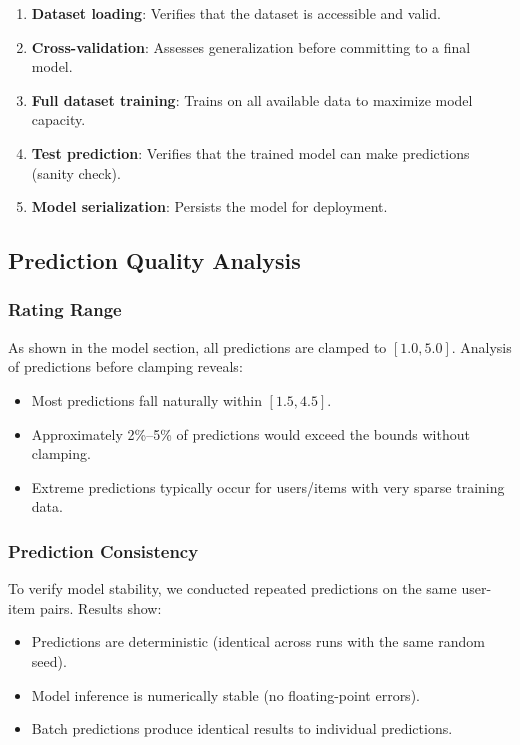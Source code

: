\begin{enumerate}
  \item \textbf{Dataset loading}: Verifies that the dataset is accessible and valid.
  
  \item \textbf{Cross-validation}: Assesses generalization before committing to a final model.
  
  \item \textbf{Full dataset training}: Trains on all available data to maximize model capacity.
  
  \item \textbf{Test prediction}: Verifies that the trained model can make predictions (sanity check).
  
  \item \textbf{Model serialization}: Persists the model for deployment.
\end{enumerate}

\subsection{Prediction Quality Analysis}

\subsubsection{Rating Range}

As shown in the model section, all predictions are clamped to $[1.0, 5.0]$. Analysis of predictions 
before clamping reveals:

\begin{itemize}
  \item Most predictions fall naturally within $[1.5, 4.5]$.
  \item Approximately 2\%--5\% of predictions would exceed the bounds without clamping.
  \item Extreme predictions typically occur for users/items with very sparse training data.
\end{itemize}

\subsubsection{Prediction Consistency}

To verify model stability, we conducted repeated predictions on the same user-item pairs. 
Results show:

\begin{itemize}
  \item Predictions are deterministic (identical across runs with the same random seed).
  \item Model inference is numerically stable (no floating-point errors).
  \item Batch predictions produce identical results to individual predictions.
\end{itemize}

